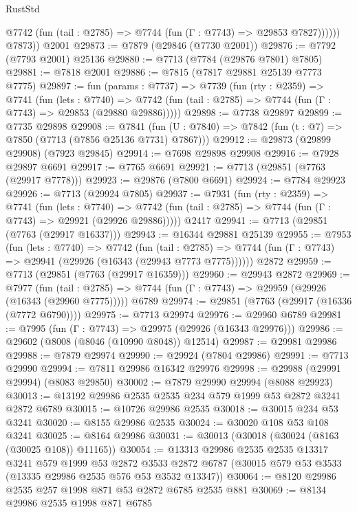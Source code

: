 \begin{lexlean}{RustStd}
\begin{coremodule}
              @7742 (fun (tail : @2785) => @7744 (fun (Γ : @7743) => @29853 @7827))))))
        @7873))
    @2001
@29873 := @7879 (@29846 (@7730 @2001))
@29876 := @7792 (@7793 @2001) @25136
@29880 := @7713 (@7784 (@29876 @7801) @7805)
@29881 := @7818 @2001
@29886 := @7815 (@7817 @29881 @25139 @7773 @7775)
@29897 := fun (params : @7737) =>
  @7739
    (fun (rty : @2359) =>
    @7741
      (fun (lets : @7740) =>
      @7742 (fun (tail : @2785) => @7744 (fun (Γ : @7743) => @29853 (@29880 @29886)))))
@29898 := @7738 @29897
@29899 := @7735 @29898
@29908 := @7841
    (fun (U : @7840) => @7842 (fun (t : @7) => @7850 (@7713 (@7856 @25136 @7731) @7867)))
@29912 := @29873 (@29899 @29908) (@7923 @29845)
@29914 := @7698 @29898 @29908
@29916 := @7928 @29897 @6691
@29917 := @7765 @6691
@29921 := @7713 (@29851 (@7763 (@29917 @7778)))
@29923 := @29876 (@7800 @6691)
@29924 := @7784 @29923
@29926 := @7713 (@29924 @7805)
@29937 := @7931
    (fun (rty : @2359) =>
    @7741
      (fun (lets : @7740) =>
      @7742 (fun (tail : @2785) => @7744 (fun (Γ : @7743) => @29921 (@29926 @29886)))))
    @2417
@29941 := @7713 (@29851 (@7763 (@29917 @16337)))
@29943 := @16344 @29881 @25139
@29955 := @7953
    (fun (lets : @7740) =>
    @7742
      (fun (tail : @2785) =>
      @7744 (fun (Γ : @7743) => @29941 (@29926 (@16343 (@29943 @7773 @7775))))))
    @2872
@29959 := @7713 (@29851 (@7763 (@29917 @16359)))
@29960 := @29943 @2872
@29969 := @7977
    (fun (tail : @2785) => @7744 (fun (Γ : @7743) => @29959 (@29926 (@16343 (@29960 @7775)))))
    @6789
@29974 := @29851 (@7763 (@29917 (@16336 (@7772 @6790))))
@29975 := @7713 @29974
@29976 := @29960 @6789
@29981 := @7995 (fun (Γ : @7743) => @29975 (@29926 (@16343 @29976)))
@29986 := @29602 (@8008 (@8046 (@10990 @8048)) @12514)
@29987 := @29981 @29986
@29988 := @7879 @29974
@29990 := @29924 (@7804 @29986)
@29991 := @7713 @29990
@29994 := @7811 @29986 @16342 @29976
@29998 := @29988 (@29991 @29994) (@8083 @29850)
@30002 := @7879 @29990 @29994 (@8088 @29923)
@30013 := @13192 @29986 @2535 @2535 @234 @579 @1999 @53 @2872 @3241 @2872 @6789
@30015 := @10726 @29986 @2535
@30018 := @30015 @234 @53 @3241
@30020 := @8155 @29986 @2535
@30024 := @30020 @108 @53 @108 @3241
@30025 := @8164 @29986
@30031 := @30013 (@30018 (@30024 (@8163 (@30025 @108)) @11165))
@30054 := @13313
    @29986
    @2535
    @2535
    @13317
    @3241
    @579
    @1999
    @53
    @2872
    @3533
    @2872
    @6787
    (@30015 @579 @53 @3533 (@13335 @29986 @2535 @576 @53 @3532 @13347))
@30064 := @8120 @29986 @2535 @257 @1998 @871 @53 @2872 @6785 @2535 @881
@30069 := @8134 @29986 @2535 @1998 @871 @6785

\end{coremodule}
\end{lexlean}
